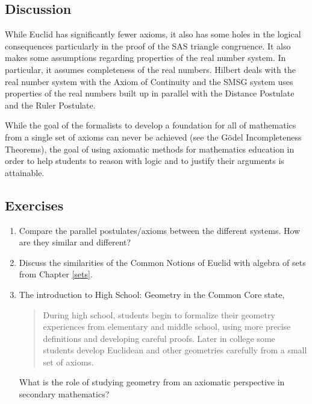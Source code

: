 \documentclass[
]{book}
\theoremstyle{definition}
\theoremstyle{definition}
\theoremstyle{definition}
\theoremstyle{definition}
\theoremstyle{remark}
\begin{document}
\hypertarget{discussion}{%
\subsection{Discussion}\label{discussion}}

While Euclid has significantly fewer axioms, it also has some holes in the logical consequences particularly in the proof of the SAS triangle congruence. It also makes some assumptions regarding properties of the real number system. In particular, it assumes completeness of the real numbers. Hilbert deals with the real number system with the Axiom of Continuity and the SMSG system uses properties of the real numbers built up in parallel with the Distance Postulate and the Ruler Postulate.

While the goal of the formalists to develop a foundation for all of mathematics from a single set of axioms can never be achieved (see the Gödel Incompleteness Theorems), the goal of using axiomatic methods for mathematics education in order to help students to reason with logic and to justify their arguments is attainable.

\hypertarget{exercises-38}{%
\subsection{Exercises}\label{exercises-38}}

\begin{enumerate}
\def\labelenumi{\arabic{enumi}.}
\item
  Compare the parallel postulates/axioms between the different systems. How are they similar and different?
\item
  Discuss the similarities of the Common Notions of Euclid with algebra of sets from Chapter \ref{sets}.
\item
  The introduction to High School: Geometry in the Common Core state,

  \begin{quote}
  During high school, students begin to formalize their geometry experiences from elementary and middle school, using more precise definitions and developing careful proofs. Later in college some students develop Euclidean and other geometries carefully from a small set of axioms.
  \end{quote}

  What is the role of studying geometry from an axiomatic perspective in secondary mathematics?
\end{enumerate}
\end{document}

